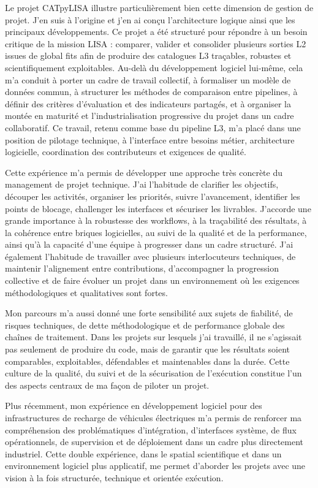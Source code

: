 \documentclass[11pt,a4paper]{../_shared/altacv}
\begin{document}
{Le projet CATpyLISA illustre particulièrement bien cette dimension de gestion de projet. J'en suis à l'origine et j'en ai conçu l'architecture logique ainsi que les principaux développements. Ce projet a été structuré pour répondre à un besoin critique de la mission LISA : comparer, valider et consolider plusieurs sorties L2 issues de global fits afin de produire des catalogues L3 traçables, robustes et scientifiquement exploitables. Au-delà du développement logiciel lui-même, cela m'a conduit à porter un cadre de travail collectif, à formaliser un modèle de données commun, à structurer les méthodes de comparaison entre pipelines, à définir des critères d'évaluation et des indicateurs partagés, et à organiser la montée en maturité et l'industrialisation progressive du projet dans un cadre collaboratif. Ce travail, retenu comme base du pipeline L3, m'a placé dans une position de pilotage technique, à l'interface entre besoins métier, architecture logicielle, coordination des contributeurs et exigences de qualité.

Cette expérience m'a permis de développer une approche très concrète du management de projet technique. J'ai l'habitude de clarifier les objectifs, découper les activités, organiser les priorités, suivre l'avancement, identifier les points de blocage, challenger les interfaces et sécuriser les livrables. J'accorde une grande importance à la robustesse des workflows, à la traçabilité des résultats, à la cohérence entre briques logicielles, au suivi de la qualité et de la performance, ainsi qu'à la capacité d'une équipe à progresser dans un cadre structuré. J'ai également l'habitude de travailler avec plusieurs interlocuteurs techniques, de maintenir l'alignement entre contributions, d'accompagner la progression collective et de faire évoluer un projet dans un environnement où les exigences méthodologiques et qualitatives sont fortes.

Mon parcours m'a aussi donné une forte sensibilité aux sujets de fiabilité, de risques techniques, de dette méthodologique et de performance globale des chaînes de traitement. Dans les projets sur lesquels j'ai travaillé, il ne s'agissait pas seulement de produire du code, mais de garantir que les résultats soient comparables, exploitables, défendables et maintenables dans la durée. Cette culture de la qualité, du suivi et de la sécurisation de l'exécution constitue l'un des aspects centraux de ma façon de piloter un projet.

Plus récemment, mon expérience en développement logiciel pour des infrastructures de recharge de véhicules électriques m'a permis de renforcer ma compréhension des problématiques d'intégration, d'interfaces système, de flux opérationnels, de supervision et de déploiement dans un cadre plus directement industriel. Cette double expérience, dans le spatial scientifique et dans un environnement logiciel plus applicatif, me permet d'aborder les projets avec une vision à la fois structurée, technique et orientée exécution.

}
\end{document}
